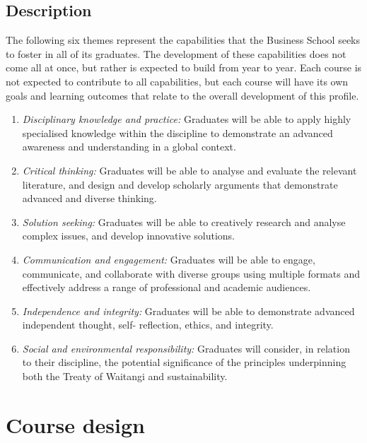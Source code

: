 \documentclass[]{book}
\theoremstyle{definition}
\theoremstyle{definition}
\theoremstyle{definition}
\theoremstyle{remark}
\begin{document}
\hypertarget{description}{%
\section{Description}\label{description}}

The following six themes represent the capabilities that the Business
School seeks to foster in all of its graduates. The development of these
capabilities does not come all at once, but rather is expected to build
from year to year. Each course is not expected to contribute to all
capabilities, but each course will have its own goals and learning
outcomes that relate to the overall development of this profile.

\begin{enumerate}
\def\labelenumi{\arabic{enumi}.}
\item
  \emph{Disciplinary knowledge and practice:} Graduates will be able to
  apply highly specialised knowledge within the discipline to
  demonstrate an advanced awareness and understanding in a global
  context.
\item
  \emph{Critical thinking:} Graduates will be able to analyse and
  evaluate the relevant literature, and design and develop scholarly
  arguments that demonstrate advanced and diverse thinking.
\item
  \emph{Solution seeking:} Graduates will be able to creatively research
  and analyse complex issues, and develop innovative solutions.
\item
  \emph{Communication and engagement:} Graduates will be able to engage,
  communicate, and collaborate with diverse groups using multiple
  formats and effectively address a range of professional and academic
  audiences.
\item
  \emph{Independence and integrity:} Graduates will be able to
  demonstrate advanced independent thought, self- reflection, ethics,
  and integrity.
\item
  \emph{Social and environmental responsibility:} Graduates will
  consider, in relation to their discipline, the potential significance
  of the principles underpinning both the Treaty of Waitangi and
  sustainability.
\end{enumerate}

\hypertarget{course-design}{%
\chapter{Course design}\label{course-design}}
\end{document}
